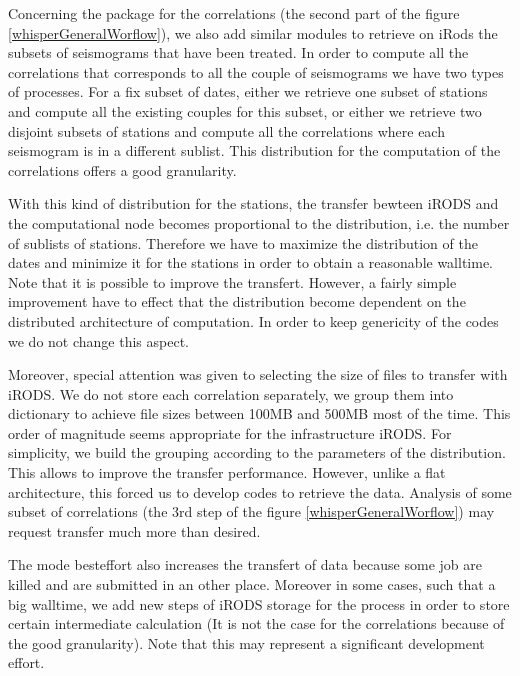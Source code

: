 \documentclass[a4paper, 10pt]{article}
\begin{document}
\begin{multicols}{2}
Concerning the package for the correlations (the second part of the figure \ref{whisperGeneralWorflow}), we also add similar modules
to retrieve on iRods the subsets of seismograms that have been treated. In order to compute all the correlations that corresponds to
all the couple of seismograms we have two types of processes. For a fix subset of dates, either we retrieve one subset of stations 
and compute all the existing couples for this subset, or either we retrieve two disjoint subsets of stations and compute all the 
correlations where each seismogram is in a different sublist. This distribution for the computation of the correlations offers a good granularity.


With this kind of distribution for the stations, the transfer bewteen iRODS and the computational node becomes proportional to 
the distribution, i.e. the number of sublists of stations. Therefore we have to maximize the distribution of the dates and minimize it
for the stations in order to obtain a reasonable walltime. Note that it is possible to improve the transfert.
However, a fairly simple improvement have to effect that the distribution become dependent on the distributed architecture of computation.
In order to keep genericity of the codes we do not change this aspect.

Moreover, special attention was given to selecting the size of files to transfer with iRODS.
We do not store each correlation separately, we group them into dictionary to achieve file sizes between 100MB and 500MB most of the time. 
This order of magnitude seems appropriate for the infrastructure iRODS.
For simplicity, we build the grouping according to the parameters of the distribution. This allows to improve the transfer performance.
However, unlike a flat architecture, this forced us to develop codes to retrieve the data. Analysis of some subset of correlations (the 3rd step of the figure \ref{whisperGeneralWorflow}) may request transfer much more than desired.


The mode besteffort also increases the transfert of data because some job are killed and are submitted in an other place.
Moreover in some cases, such that a big walltime, we add new steps of iRODS storage for the process in order to store certain intermediate calculation
(It is not the case for the correlations because of the good granularity). Note that this may represent a significant development effort.



\end{multicols}
\end{document}

